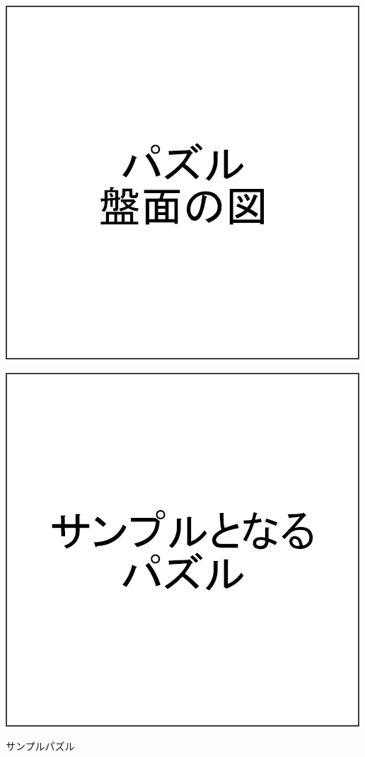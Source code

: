 \begin{clearpagefigure}
  \includegraphics[width=0.8\linewidth,clip]{fig/board.png}
  \caption{}
  \label{figure:Board}
\end{clearpagefigure}

\begin{clearpagefigure}
  \includegraphics[width=0.8\linewidth,clip]{fig/samplePuzzle.png}
  \caption{サンプルパズル}
  \label{figure:SamplePuzzle}
\end{clearpagefigure}


